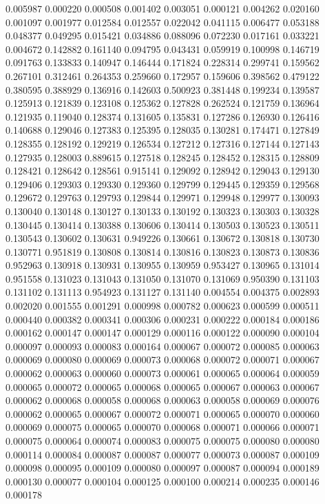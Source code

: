 0.005987
0.000220
0.000508
0.001402
0.003051
0.000121
0.004262
0.020160
0.001097
0.001977
0.012584
0.012557
0.022042
0.041115
0.006477
0.053188
0.048377
0.049295
0.015421
0.034886
0.088096
0.072230
0.017161
0.033221
0.004672
0.142882
0.161140
0.094795
0.043431
0.059919
0.100998
0.146719
0.091763
0.133833
0.140947
0.146444
0.171824
0.228314
0.299741
0.159562
0.267101
0.312461
0.264353
0.259660
0.172957
0.159606
0.398562
0.479122
0.380595
0.388929
0.136916
0.142603
0.500923
0.381448
0.199234
0.139587
0.125913
0.121839
0.123108
0.125362
0.127828
0.262524
0.121759
0.136964
0.121935
0.119040
0.128374
0.131605
0.135831
0.127286
0.126930
0.126416
0.140688
0.129046
0.127383
0.125395
0.128035
0.130281
0.174471
0.127849
0.128355
0.128192
0.129219
0.126534
0.127212
0.127316
0.127144
0.127143
0.127935
0.128003
0.889615
0.127518
0.128245
0.128452
0.128315
0.128809
0.128421
0.128642
0.128561
0.915141
0.129092
0.128942
0.129043
0.129130
0.129406
0.129303
0.129330
0.129360
0.129799
0.129445
0.129359
0.129568
0.129672
0.129763
0.129793
0.129844
0.129971
0.129948
0.129977
0.130093
0.130040
0.130148
0.130127
0.130133
0.130192
0.130323
0.130303
0.130328
0.130445
0.130414
0.130388
0.130606
0.130414
0.130503
0.130523
0.130511
0.130543
0.130602
0.130631
0.949226
0.130661
0.130672
0.130818
0.130730
0.130771
0.951819
0.130808
0.130814
0.130816
0.130823
0.130873
0.130836
0.952963
0.130918
0.130931
0.130955
0.130959
0.953427
0.130965
0.131014
0.951558
0.131023
0.131043
0.131050
0.131070
0.131069
0.950390
0.131103
0.131102
0.131113
0.954923
0.131127
0.131140
0.004554
0.004375
0.002893
0.002020
0.001555
0.001291
0.000998
0.000782
0.000623
0.000599
0.000511
0.000440
0.000382
0.000341
0.000306
0.000231
0.000222
0.000184
0.000186
0.000162
0.000147
0.000147
0.000129
0.000116
0.000122
0.000090
0.000104
0.000097
0.000093
0.000083
0.000164
0.000067
0.000072
0.000085
0.000063
0.000069
0.000080
0.000069
0.000073
0.000068
0.000072
0.000071
0.000067
0.000062
0.000063
0.000060
0.000073
0.000061
0.000065
0.000064
0.000059
0.000065
0.000072
0.000065
0.000068
0.000065
0.000067
0.000063
0.000067
0.000062
0.000068
0.000058
0.000068
0.000063
0.000058
0.000069
0.000076
0.000062
0.000065
0.000067
0.000072
0.000071
0.000065
0.000070
0.000060
0.000069
0.000075
0.000065
0.000070
0.000068
0.000071
0.000066
0.000071
0.000075
0.000064
0.000074
0.000083
0.000075
0.000075
0.000080
0.000080
0.000114
0.000084
0.000087
0.000087
0.000077
0.000073
0.000087
0.000109
0.000098
0.000095
0.000109
0.000080
0.000097
0.000087
0.000094
0.000189
0.000130
0.000077
0.000104
0.000125
0.000100
0.000214
0.000235
0.000146
0.000178
